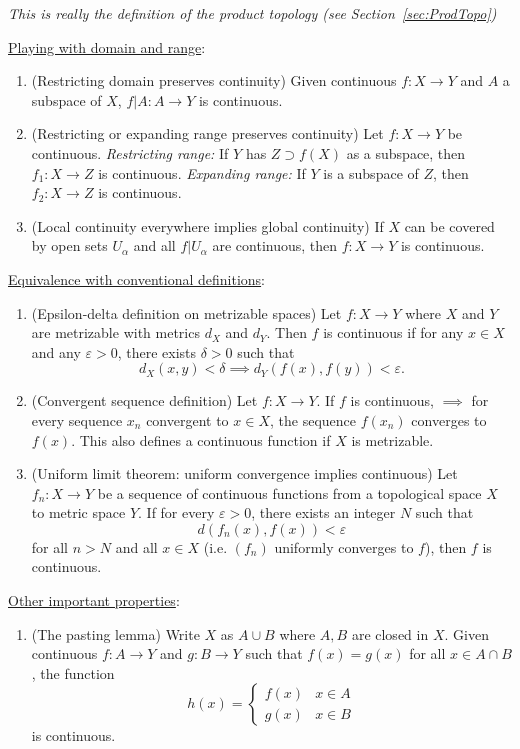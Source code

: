 \documentclass[letterpaper, 12pt]{article}
\newcommand{\eps}{\varepsilon}
\begin{document}
\begin{enumerate}[resume]
\begin{enumerate}
                \textit{This is really the definition of the product topology (see Section~\ref{sec:ProdTopo})}
            \end{enumerate}
        \underline{Playing with domain and range}:
            \begin{enumerate}[resume]
            \item (Restricting domain preserves continuity) Given continuous $f:X\to Y$ and $A$ a subspace of $X$, $f|A : A\to Y$ is continuous.
            \item (Restricting or expanding range preserves continuity) Let $f:X\to Y$ be continuous. \textit{Restricting range:} If $Y$ has $Z \supset f(X)$ as a subspace, then $f_1: X\to Z$ is continuous. \textit{Expanding range:} If $Y$ is a subspace of $Z$, then $f_2:X\to Z$ is continuous.
            \item (Local continuity everywhere implies global continuity) If $X$ can be covered by open sets $U_\alpha$ and all $f|U_\alpha$ are continuous, then $f:X\to Y$ is continuous.
            \end{enumerate}
        \underline{Equivalence with conventional definitions}:
            \begin{enumerate}[resume]
            \item (Epsilon-delta definition on metrizable spaces) Let $f:X\to Y$ where $X$ and $Y$ are metrizable with metrics $d_X$ and $d_Y$. Then $f$ is continuous if for any $x\in X$ and any $\eps > 0$, there exists $\delta > 0$ such that \[d_X(x, y) < \delta \implies d_Y(f(x), f(y)) < \eps.\]
            \item (Convergent sequence definition) Let $f:X\to Y$. If $f$ is continuous, $\implies$ for every sequence $x_n$ convergent to $x\in X$, the sequence $f(x_n)$ converges to $f(x)$. This also defines a continuous function if $X$ is metrizable.
            \item (Uniform limit theorem: uniform convergence implies continuous) Let $f_n : X\to Y$ be a sequence of continuous functions from a topological space $X$ to metric space $Y$. If for every $\eps> 0$, there exists an integer $N$ such that \[d(f_n(x), f(x)) < \eps\] for all $n>N$ and all $x\in X$ (i.e. $(f_n)$ uniformly converges to $f$), then $f$ is continuous.
            \end{enumerate}
        \underline{Other important properties}:
            \begin{enumerate}[resume]
            \item (The pasting lemma) Write $X$ as $A\cup B$ where $A, B$ are closed in $X$. Given continuous $f:A\to Y$ and $g:B\to Y$ such that $f(x) = g(x)$ for all $x\in A \cap B$, the function \[h(x) = \begin{cases}f(x) & x\in A \\ g(x) & x\in B\end{cases}\] is continuous.

\end{enumerate}
\end{enumerate}
\end{document}
